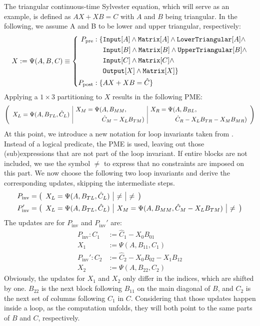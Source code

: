 The triangular continuous-time Sylvester equation, which will serve as an example, is defined as $AX+XB=C$ with $A$ and $B$ being triangular. In the following, we assume A and B to be lower and upper triangular, respectively:
%
$$X:= \Psi ( A, B, C) \equiv
\left\{
\begin{aligned}
P_\text{pre}: \{ &\text{\ttfamily Input}[A] \land \text{\ttfamily Matrix}[A] \land \text{\ttfamily LowerTriangular}[A] \land \\
		&\text{\ttfamily Input}[B] \land \text{\ttfamily Matrix}[B] \land \text{\ttfamily UpperTriangular}[B] \land \\
		&\text{\ttfamily Input}[C] \land \text{\ttfamily Matrix}[C] \land \\
		&\text{\ttfamily Output}[X] \land \text{\ttfamily Matrix}[X] \} \\
P_\text{post}: \{ &AX + XB = \hat{C} \}
\end{aligned}
\right.$$
%
Applying a $1 \times 3$ partitioning to $X$ results in the following PME:
%
$$
\myFlaOneByThree{
X_L = \Psi(A, B_{TL}, \hat{C}_L)}
%
{\begin{aligned}
X_M = \Psi(&A, B_{MM}, \\
&\hat{C}_M - X_L B_{TM})
\end{aligned}}
%
{\begin{aligned}
X_R = \Psi(&A, B_{BL}, \\
&\hat{C}_R - X_L B_{TR} - X_M B_{MR})
\end{aligned}}
$$
%
At this point, we introduce a new notation for loop invariants taken from \cite{Fabregat-Traver:thesis}. Instead of a logical predicate, the PME is used, leaving out those (sub)expressions that are not part of the loop invariant. If entire blocks are not included, we use the symbol $\neq$ to express that no constraints are imposed on this part. We now choose the following two loop invariants and derive the corresponding updates, skipping the intermediate steps.
%
\begin{align*}
&P_\text{inv} = \myFlaOneByThree{X_L = \Psi(A, B_{TL}, \hat{C}_L)}	{\neq}	{\neq}\\
&P_\text{inv}' = \myFlaOneByThree{X_L = \Psi(A, B_{TL}, \hat{C}_L)}	{X_M = \Psi(A, B_{MM}, \hat{C}_M - X_L B_{TM})}	{\neq}
\end{align*}
%
The updates are for $P_\text{inv}$ and $P_\text{inv}'$ are:
%
\begin{align*}
P_\text{inv}: C_1 &:= \hat{C}_1 - X_0 B_{01}\\
X_1 &:= \Psi(A, B_{11}, C_1) \\
P_\text{inv}': C_2 &:= \hat{C}_2 - X_0 B_{02} - X_1 B_{12} \\
X_2 &:= \Psi(A, B_{22}, C_2)
\end{align*}
%
Obviously, the updates for $X_1$ and $X_2$ only differ in the indices, which are shifted by one. $B_{22}$ is  the next block following $B_{11}$ on the main diagonal of $B$, and $C_2$ is the next set of columns following $C_1$ in $C$. Considering that those updates happen inside a loop, as the computation unfolds, they will both point to the same parts of $B$ and $C$, respectively.

